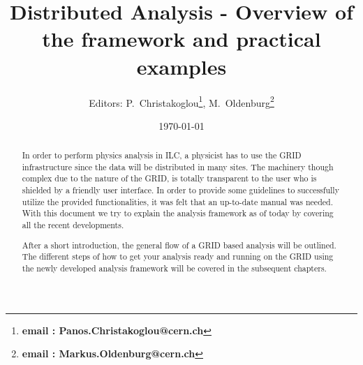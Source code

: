 \documentclass[12pt,a4paper,twoside]{article}
\begin{document}
\title{Distributed Analysis - Overview of the framework and practical examples}
\author{Editors: P.~Christakoglou\footnote{{\bf email : Panos.Christakoglou@cern.ch}}, M.~Oldenburg\footnote{{\bf email : Markus.Oldenburg@cern.ch}}}
\date{\today}

\maketitle

\begin{abstract}
In order to perform physics analysis in ILC, a physicist has to use the GRID infrastructure since the data will be distributed in many sites. The machinery though complex due to the nature of the GRID, is totally transparent to the user who is shielded by a friendly user interface. In order to provide some guidelines to successfully utilize the provided functionalities, it was felt that an up-to-date manual was needed. With this document we try to explain the analysis framework as of today by covering all the recent developments.

After a short introduction, the general flow of a GRID based analysis will be outlined. The different steps of how to get your analysis ready and running on the GRID using the newly developed analysis framework will be covered in the subsequent chapters.


\end{abstract}

\newpage
\tableofcontents









\begin{appendix}


\end{appendix}
\end{document}
